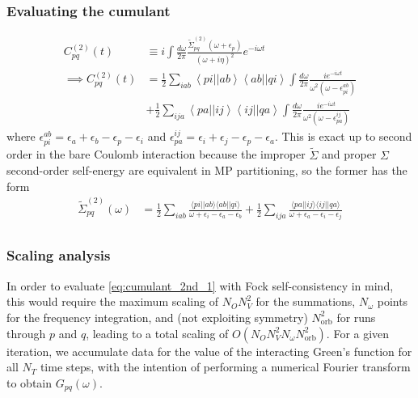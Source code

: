 \begin{frame}
    \frametitle{Evaluating the cumulant}
\begin{align}
C_{pq}^{(2)}(t) &\equiv i \int \frac{d\omega}{2\pi} \frac{ \tilde{\Sigma}_{pq}^{(2)}\left(\omega+\epsilon_p\right)}{(\omega + i \eta)^2} e^{-i \omega t} \\
\implies C_{pq}^{(2)}(t) &= \frac{1}{2} \sum_{iab} \left< pi \left| \right| ab \right> \left< ab \left| \right| qi \right> \int \frac{d\omega}{2\pi} \frac{i e^{-i \omega t}}{\omega^2\left(\omega-\epsilon_{pi}^{ab}\right)}\\
&+ \frac{1}{2} \sum_{ija} \left< pa \left| \right| ij \right> \left< ij \left| \right| qa \right> \int \frac{d\omega}{2\pi} \frac{i e^{-i \omega t}}{\omega^2\left(\omega-\epsilon_{pa}^{ij}\right)}
\label{eq:cumulant_2nd_1}
\end{align}
where
$\epsilon_{pi}^{ab} = \epsilon_{a}+\epsilon_{b}-\epsilon_{p}-\epsilon_{i}$
and
$\epsilon_{pa}^{ij} = \epsilon_{i}+\epsilon_{j}-\epsilon_{p}-\epsilon_{a}$. This is exact up to second order in the bare Coulomb interaction because the improper $\tilde{\Sigma}$ and proper $\Sigma$ second-order self-energy are equivalent in MP partitioning, so the former has the form
\begin{align}
    \tilde{\Sigma}_{pq}^{(2)}(\omega) &= \frac{1}{2} \sum_{iab} \frac{\langle pi || ab \rangle \langle ab || qi \rangle}{\omega + \epsilon_i - \epsilon_a - \epsilon_b} + \frac{1}{2} \sum_{ija} \frac{\langle pa || ij \rangle \langle ij || qa \rangle}{\omega + \epsilon_a - \epsilon_i - \epsilon_j} \\
\end{align}

\end{frame}

\begin{frame}
    \frametitle{Scaling analysis}
In order to evaluate \ref{eq:cumulant_2nd_1} with Fock self-consistency in mind, this would require the maximum scaling of $N_O N_V^2$ for the summations, $N_\omega$ points for the frequency integration, and (not exploiting symmetry) $N_{\text{orb}}^2$ for runs through $p$ and $q$, leading to a total scaling of $O(N_O N_V^2 N_\omega N_{\text{orb}}^2)$. For a given iteration, we accumulate data for the value of the interacting Green's function for all $N_T$ time steps, with the intention of performing a numerical Fourier transform to obtain $G_{pq}(\omega)$.
\end{frame}
